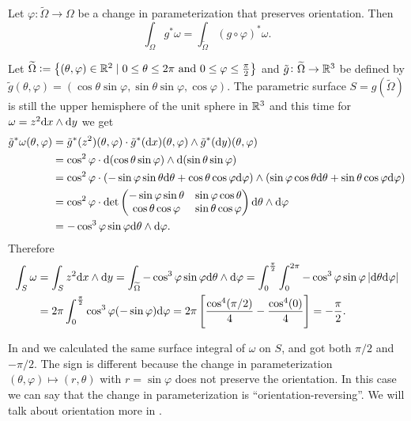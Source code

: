 \documentclass[11pt,a4paper]{article}
\begin{document}
\begin{proposition}
  Let $\varphi \colon \widetilde \Omega \to \Omega$
  be a change in parameterization that preserves orientation.
  Then
  \[
    \int_{\Omega} g^*\omega =
    \int_{\widetilde \Omega} (g \circ \varphi)^*\omega.
  \]
\end{proposition}

\begin{example}
  \label{exmp:negative-orientation}
  Let $\widetilde \Omega := \left\{(\theta,\varphi) \in \mathbb{R}^2 \mid 0 \le \theta \le 2\pi \text{ and } 0 \le \varphi \le \frac{\pi}{2}\right\}$
  and $\tilde g \colon \widetilde \Omega \to \mathbb{R}^3$ be defined
  by $\tilde g(\theta,\varphi) = (\cos\theta\sin\varphi,\sin\theta\sin\varphi,\cos\varphi)$.
  The parametric surface $S = g(\widetilde \Omega)$ is still
  the upper hemisphere
  of the unit sphere in $\mathbb{R}^3$ and this time
  for $\omega = z^2 \dx \wedge \dy$ we get
  \begin{align*}
    \tilde g^*\omega(\theta,\varphi) &=
    \tilde g^*(z^2)(\theta,\varphi) \cdot \tilde g^*(\dx)(\theta,\varphi) \wedge \tilde g^*(\dy)(\theta,\varphi) \\ &=
    \cos^2\varphi \cdot \dif(\cos\theta\sin\varphi) \wedge \dif(\sin\theta\sin\varphi) \\ &=
    \cos^2\varphi \cdot
      (-\sin\varphi\sin\theta \dtheta + \cos\theta\cos\varphi \dvarphi) \wedge
      (\sin\varphi\cos\theta \dtheta + \sin\theta\cos\varphi \dvarphi) \\ &=
    \cos^2\varphi \cdot
    \det
    \begin{pmatrix}
      -\sin\varphi\sin\theta & \sin\varphi\cos\theta \\
      \cos\theta\cos\varphi & \sin\theta\cos\varphi
    \end{pmatrix} \dtheta \wedge \dvarphi \\ &=
    -\cos^3\varphi\sin\varphi \dtheta \wedge \dvarphi.
  \end{align*}
  Therefore
  \begin{align*}
    \int_{S} \omega &=
    \int_{S} z^2 \dx \wedge \dy =
    \int_{\widetilde \Omega}
      -\cos^3\varphi\sin\varphi \dtheta \wedge \dvarphi =
    \int_{0}^{\frac{\pi}{2}} \int_{0}^{2\pi}
      -\cos^3\varphi\sin\varphi \abs{\dtheta \dvarphi} \\ &=
    2\pi \int_{0}^{\frac{\pi}{2}}
      \cos^3\varphi(-\sin\varphi) \dvarphi =
    2\pi \left[\frac{\cos^4(\pi/2)}{4} - \frac{\cos^4(0)}{4}\right] =
    -\frac{\pi}{2}.
  \end{align*}
\end{example}
\begin{remark}
  \label{rmk:orienation-reversing}
  In  and 
  we calculated the same surface integral of $\omega$ on $S$,
  and got both $\pi/2$ and $-\pi/2$.
  The sign is different because the change in parameterization
  $(\theta,\varphi) \mapsto (r,\theta)$ with $r = \sin\varphi$
  does not preserve the orientation.
  In this case we can say that the change in parameterization
  is ``orientation-reversing''.
  We will talk about orientation more in .
\end{remark}
\end{document}
